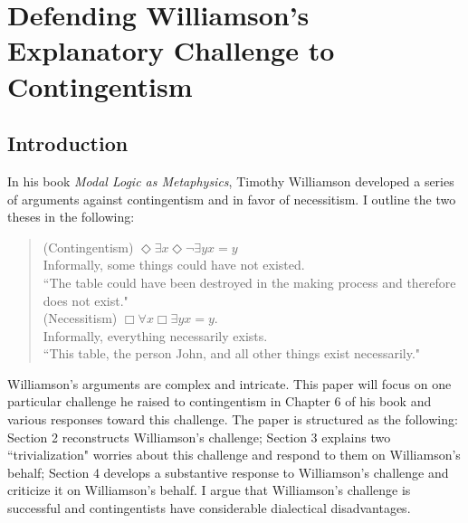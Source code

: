 \chapter{Defending Williamson's Explanatory Challenge to Contingentism}
\renewcommand*{\thesection}{\arabic{section}.}
\renewcommand*{\thesubsection}{\arabic{section}.\arabic{subsection}.}

\section{Introduction}
In his book \emph{Modal Logic as Metaphysics}, Timothy Williamson developed a series of arguments against contingentism and in favor of necessitism. I outline the two theses in the following: 
\begin{quote}
(Contingentism) \hspace{\labelsep} $\Diamond \exists x \Diamond \neg \exists y x=y$ \smallskip \\
Informally, some things could have not existed. \smallskip \\
``The table could have been destroyed in the making process and therefore does not exist." \bigskip \\
(Necessitism) \hspace{\labelsep} $\Box \forall x \Box \exists y x=y$.  \smallskip \\
Informally, everything necessarily exists. \smallskip \\
``This table, the person John, and all other things exist necessarily."
\end{quote}
Williamson's arguments are complex and intricate. This paper will focus on one particular challenge he raised to contingentism in Chapter 6 of his book and various responses toward this challenge. The paper is structured as the following: Section 2 reconstructs Williamson's challenge; Section 3 explains two ``trivialization" worries about this challenge and respond to them on Williamson's behalf; Section 4 develops a substantive response to Williamson's challenge and criticize it on Williamson's behalf. I argue that Williamson's challenge is successful and contingentists have considerable dialectical disadvantages.  

